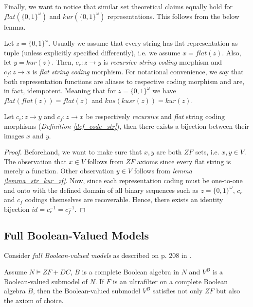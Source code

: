 Finally, we want to notice that similar set theoretical claims equally hold for $flat(\{0,1\}^\omega)$ and $kur(\{0,1\}^\omega)$ representations. This follows from the below lemma.

\begin{definition}\label{def_code_str}
    Let $z = \{0,1\}^\omega$. Usually we assume that every string has flat representation as tuple (unless explicitly specified differently), i.e. we assume $x = flat(z)$. Also, let $y = kur(z)$. Then, $c_r: z \to y$ is \textit{recursive string coding} morphism and $c_f: z \to x$ is \textit{flat string coding} morphism. For notational convenience, we say that both representation functions are aliases to respective coding morphism and are, in fact, idempotent. Meaning that for $z = \{0,1\}^\omega$ we have $flat(flat(z)) = flat(z)$ and $kus(kusr(z)) = kur(z)$.
\end{definition}

\begin{lemma}\label{lemma_kurflat_eq}
    Let $c_r: z \to y$ and $c_f: z \to x$ be respectively \textit{recursive} and \textit{flat} string coding morphisms (\textit{Definition \ref{def_code_str}}), then there exists a bijection between their images $x$ and $y$.
\end{lemma}
\begin{proof}
    Beforehand, we want to make sure that $x, y$ are both $ZF$ sets, i.e. $x, y \in V$. The observation that $x \in V$ follows from $ZF$ axioms since every flat string is merely a function. Other observation $y \in V$ follows from \textit{lemma \ref{lemma_str_kur_zf}}. Now, since each representation coding must be one-to-one and onto with the defined domain of all binary sequences such as $z = \{0,1\}^\omega$, $c_r$ and $c_f$ codings themselves are recoverable. Hence, there exists an identity bijection $id = c_r^{-1} = c_f^{-1}$.
\end{proof}


\subsection{Full Boolean-Valued Models}

Consider \textit{full Boolean-valued models} as described on p. 208 in \cite{jech2003set}.

\begin{lemma}\label{lemma_full_bvm_zfc}
    Assume $N \models ZF+DC$, $B$ is a complete Boolean algebra in $N$ and $V^B$ is a Boolean-valued submodel of $N$. 
    If \( F \) is an ultrafilter on a complete Boolean algebra \( B \), then the Boolean-valued submodel \( V^B \) satisfies not only $ZF$ but also the axiom of choice.
\end{lemma}

